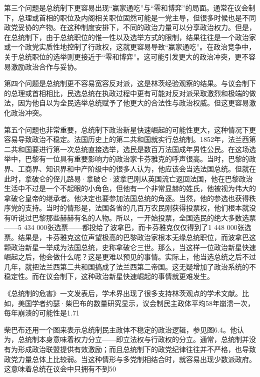 第三个问题是总统制下更容易出现“赢家通吃”与“零和博弈”的局面。通常在议会制下，总理或首相的职位及内阁相关职位固然可能是一党主导，但很多时候也是不同政党妥协的产物。在这种制度安排下，不同的政治力量可以分享政治权力。但是，在总统制下，由于总统职位的惟一性以及选举方式的限制，结果往往是一个政治家或一个政党实质性地控制了行政权，这就更容易导致“赢家通吃”。在政治竞争中，关于总统职位的选举则更接近于“零和博弈”。这可能引发更大的政治冲突，更不容易激励政治合作与妥协。

第四个问题是总统制更不容易宽容反对派，这是林茨经验观察的结果。与议会制下的总理或首相相比，民选总统在执政过程中更有可能对反对派采取激烈和极端的做法，因为他自以为全民选举总统赋予了他更大的合法性与政治权威。但这更容易激化政治冲突。

第五个问题也非常重要，总统制下政治新星快速崛起的可能性更大，这种情况下更容易导致政治不稳定。法国历史上的第二共和国就实行总统制。1852年，法兰西第二共和国要进行第一次总统直接选举，选民是数百万法国成年男性公民。在这场选举中，巴黎有一位具有重要影响力的政治家卡芬雅克的呼声很高。当时，巴黎的政界、工商界、知识界和中产阶级中的很多人认为，他应该会当选法国总统。但就在此时，拿破仑的侄儿路易·拿破仑·波拿巴刚从英国流亡返回法国，他在巴黎政治生活中不过是一个不起眼的小角色，但他有一个非常显赫的姓氏，他被视为伟大的拿破仑皇帝的继承者。他决定也要参加法国总统的角逐。当然，他的参选也获得秩序党的支持。当时的情形是，法国各省的几百万农民刚获得投票权，他们根本就没有听说过巴黎那些赫赫有名的人物。所以，一开始投票，全国选民的绝大多数选票——5 434 000张选票——都投给了波拿巴，而卡芬雅克仅仅得到了1 448 000张选票。结果是，卡芬雅克这位声望极高的巴黎政治家根本无缘总统职位，而波拿巴这颗政治新星一举成为法国总统，史称拿破仑三世。那么，当这样一位政治新星快速崛起之后，他会做什么呢？这是更难以预见的事情。实际上，他当选总统之后不过几年，就把法兰西第二共和国搞成了法兰西第二帝国。这无疑增加了政治系统的不稳定性。而在议会制下，这种政治新星快速崛起的事情就更难发生。

《总统制的危害》一文发表后，学术界出现了很多支持林茨观点的学术文献。比如，美国学者约瑟·柴巴布的数量研究显示，议会制民主政体平均58年崩溃一次，每年崩溃的可能性是1.71%

柴巴布还用一个图来表示总统制民主政体不稳定的政治逻辑，参见图6.4。他认为，总统制本身意味着权力分立——即立法权与行政权的分立。通常，总统制并没有为形成政治联盟提供有效激励；而且总统制下的政党纪律往往并不严格，也导致政党力量总体上比较弱。当这种情形与多党制相结合时，就容易出现少数派政府。这意味着总统在议会中只拥有不到50%

